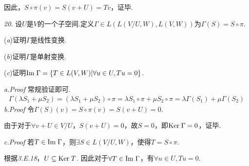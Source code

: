 因此，\(S \circ \pi(v)=S(v+U)=Tv\)，证毕.

\hspace*{\fill}

\textit{20.}
设\(U\)是\(V\)的一个子空间.定义\(\Gamma \in L(L(V/U,W),L(V,W))\)为\(\Gamma(S)=S \circ \pi\).

(\textit{a})证明\(\Gamma\)是线性变换.

(\textit{b})证明\(\Gamma\)是单射变换.

(\textit{c})证明\(\mathrm{Im \;}  \Gamma=\{T \in L(V,W)|\forall u \in U,Tu=0 \}\).

\textit{a.Proof}
常规验证即可.
    \begin{align*}
        \Gamma(\lambda S_1+\mu S_2)=(\lambda S_1+\mu S_2) \circ \pi
        =\lambda S_1 \circ \pi+\mu S_2 \circ \pi=\lambda \Gamma(S_1)+\mu \Gamma(S_2)
    \end{align*}
\textit{b.Proof}
令\(\Gamma(S)(v)=S \circ \pi(v)=S(v+U)=0\).

由于对于\(\forall v+U \in V/U\)，\(S(v+U)=0\)，故\(S=0\)，即\(\mathrm{Ker \;}  \Gamma=0\)，证毕.

\textit{c.Proof}
若\(T \in \mathrm{Im \;}  \Gamma\)，则\(\exists S \in L(V/U,W)\)，使得\(T=S \circ \pi\).

根据\textit{3.E.18}，\(U \subseteq \mathrm{Ker \;} T\).
因此对于\(\forall T \in \mathrm{Im \;} \Gamma\)，有\(\forall u \in U,Tu=0\).

